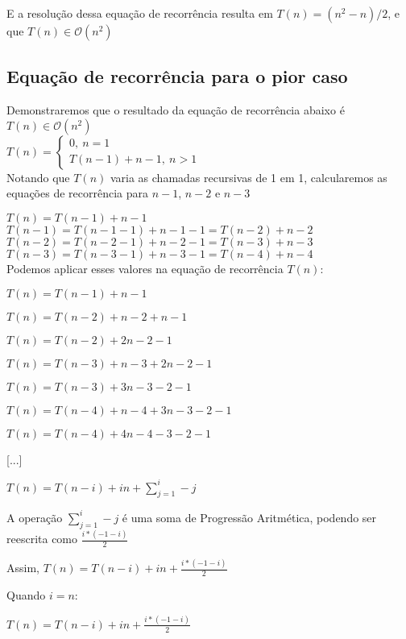 \documentclass[a4paper, twocolumn]{article}
\theoremstyle{definition}
\begin{document}
E a resolução dessa equação de recorrência resulta em $T(n) = (n^2-n)/2$, e que $T(n) \in \mathcal{O}(n^2)$

\subsection{Equação de recorrência para o pior caso}

Demonstraremos que o resultado da equação de recorrência abaixo é $T(n) \in \mathcal{O}(n^2)$ \\

$T(n) = \begin{cases} 
	0, \ n  = 1\\
	T(n-1) + n-1, \ n > 1
\end{cases}$ \\

Notando que $T(n)$ varia as chamadas recursivas de 1 em 1, calcularemos as equações de recorrência para $n-1$, $n-2$ e $n-3$

$T(n) = T(n-1) + n-1$\\

$T(n-1) = T(n-1-1) + n-1-1 = T(n-2) + n - 2$\\

$T(n-2) = T(n-2-1) + n-2-1 = T(n-3) + n - 3$\\

$T(n-3) = T(n-3-1) + n-3-1 = T(n-4) + n - 4$\\

Podemos aplicar esses valores na equação de recorrência $T(n)$:

$T(n) = T(n-1) + n-1$

$T(n) = T(n-2) + n - 2 + n-1$

$T(n) = T(n-2) +2n -2 -1$

$T(n) = T(n-3) + n - 3 +2n -2 -1$

$T(n) = T(n-3) + 3n -3 -2 -1$

$T(n) = T(n-4) + n - 4 + 3n -3 -2 -1$

$T(n) = T(n-4) + 4n -4 -3 -2 -1$

[...]

$T(n) = T(n-i) + in + \sum_{j=1}^{i} -j$

A operação $\sum_{j=1}^{i} -j$ é uma soma de Progressão Aritmética, podendo ser reescrita como $\frac{i*(-1 - i)}{2}$

Assim, $T(n) = T(n-i) + in + \frac{i*(-1 - i)}{2}$

Quando $i = n$: 

$T(n) = T(n-i) + in + \frac{i*(-1 - i)}{2}$
\end{document}
